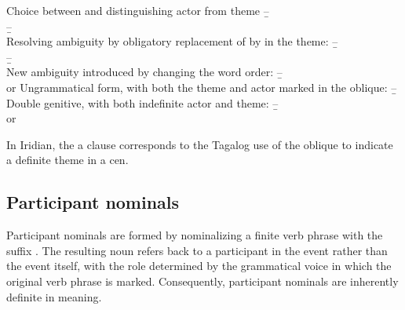 \pex[interpartskip=0pt]
    \a Choice between \Obl{} and \Gen{} distinguishing actor from theme
    \beginsubsub{}
        \b{--}{\\ }
        \b{--}{\\ }
    \endsubsub
    \a Resolving ambiguity by obligatory replacement of \Gen{} by \Obl{} in the theme:
    \beginsubsub
        \b{--}{\\
        }
        \b{--}{\\
        }
    \endsubsub
    \a New ambiguity introduced by changing the word order:
    \beginsubsub
        \b{--} {\\
         or }
    \endsubsub
    \a Ungrammatical form, with both the theme and actor marked in the oblique:
    \beginsubsub
        \b{--}{\ljudge{*}\\
        }
    \endsubsub
    \a Double genitive, with both indefinite actor and theme:
    \beginsubsub
        \b{--}{\\
         or } 
    \endsubsub
\xe


In Iridian, the a  clause corresponds to the Tagalog use
of the oblique to indicate a definite theme in a {\sc cen}. 




\subsection{Participant nominals}

Participant nominals are formed by nominalizing a finite verb phrase with the
suffix . The resulting noun refers back to a participant in the event
rather than the event itself, with the role determined by the grammatical voice
in which the original verb phrase is marked. Consequently, participant nominals
are inherently definite in meaning.

